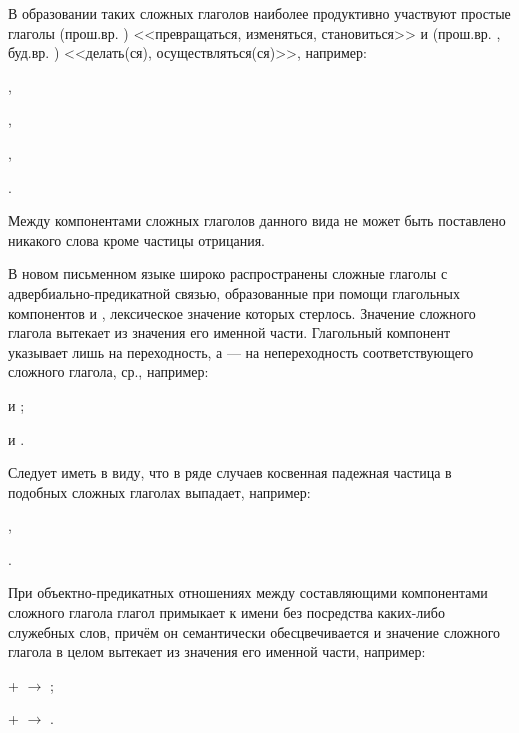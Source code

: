 В образовании таких сложных глаголов наиболее продуктивно участвуют простые глаголы	 (прош.вр. ) <<превращаться, изменяться, становиться>> и (прош.вр. , буд.вр. ) <<делать(ся), осуществляться(ся)>>, например:
\begin{prfsample}
	\item {},
	\item {},
	\item {},
	\item {}.
\end{prfsample}

Между компонентами сложных глаголов данного вида не может быть поставлено никакого слова кроме частицы отрицания.

В новом письменном языке широко распространены сложные глаголы с адвербиально-предикатной связью, образованные при помощи глагольных компонентов  и , лексическое значение которых стерлось. Значение сложного глагола вытекает из значения его именной части. Глагольный компонент  указывает лишь на переходность, а  --- на непереходность соответствующего сложного глагола, ср., например:
\begin{prfsample}
	\item {} и ;
	\item {} и .
\end{prfsample}

Следует иметь в виду, что в ряде случаев косвенная падежная частица в подобных сложных глаголах выпадает, например:
\begin{prfsample}
	\item {},
	\item {}.
\end{prfsample}

При объектно-предикатных отношениях между составляющими компонентами сложного глагола глагол примыкает к имени без посредства каких-либо служебных слов, причём он семантически обесцвечивается и значение сложного глагола в целом вытекает из значения его именной части, например:
\begin{prfsample}
	\item {} +  $\rightarrow$ ;
	\item {} +  $\rightarrow$ .
\end{prfsample}

